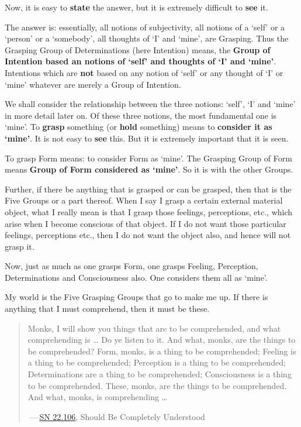 Now, it is easy to \textbf{state} the answer, but it is extremely difficult to \textbf{see} it.

The answer is: essentially, all notions of subjectivity, all notions of a `self' or a `person' or a `somebody', all thoughts of `I' and `mine', are Grasping. Thus the Grasping Group of Determinations (here Intention) means, the \textbf{Group of Intention based an notions of `self' and thoughts of `I' and `mine'}. Intentions which are \textbf{not} based on any notion of `self' or any thought of `I' or `mine' whatever are merely a Group of Intention.

We shall consider the relationship between the three notions: `self', `I' and `mine' in more detail later on. Of these three notions, the most fundamental one is `mine'. To \textbf{grasp} something (or \textbf{hold} something) means to \textbf{consider it as `mine'}. It is not easy to \textbf{see} this. But it is extremely important that it is seen.

To grasp Form means: to consider Form as `mine'. The Grasping Group of Form means \textbf{Group of Form considered as `mine'}. So it is with the other Groups.

Further, if there be anything that is grasped or can be grasped, then that is the Five Groups or a part thereof. When I say I grasp a certain external material object, what I really mean is that I grasp those feelings, perceptions, etc., which arise when I become conscious of that object. If I do not want those particular feelings, perceptions etc., then I do not want the object also, and hence will not grasp it.

Now, just as much as one grasps Form, one grasps Feeling, Perception, Determinations and Consciousness also. One considers them all as `mine'.

My world is the Five Grasping Groups that go to make me up. If there is anything that I must comprehend, then it must be these.

\begin{quote}
Monks, I will show you things that are to be comprehended, and what comprehending is \ldots\hspace{0pt} Do ye listen to it. And what, monks, are the things to be comprehended? Form, monks, is a thing to be comprehended; Feeling is a thing to be comprehended; Perception is a thing to be comprehended; Determinations are a thing to be comprehended; Consciousness is a thing to be comprehended. These, monks, are the things to be comprehended. And what, monks, is comprehending \ldots\hspace{0pt}

 --- \href{https://suttacentral.net/sn22.106/en/sujato}{SN 22.106}, Should Be Completely Understood
\end{quote}

